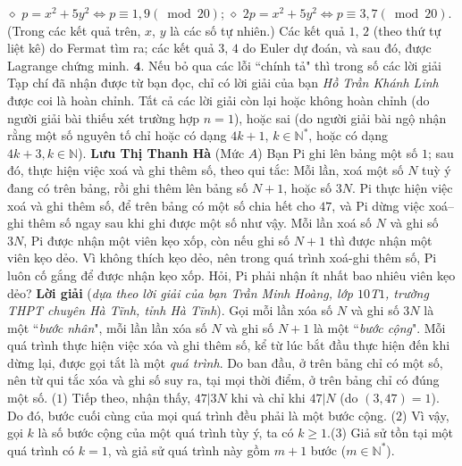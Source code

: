 \begin{multicols}{2}
	\vskip 0.05cm
	$\diamond$ $p = {x^2} + 5{y^2} \Leftrightarrow p \equiv 1,9\left( {\bmod 20} \right)$;
	\vskip 0.05cm
	$\diamond$ $2p = {x^2} + 5{y^2} \Leftrightarrow p \equiv 3,7\left( {\bmod 20} \right)$.
	\vskip 0.05cm
	(Trong các kết quả trên, $x$, $y$ là các số tự nhiên.)
	\vskip 0.05cm
	Các kết quả $1$, $2$ (theo thứ tự liệt kê) do Fermat tìm ra; các kết quả $3$, $4$ do Euler dự đoán, và sau đó, được Lagrange chứng minh.
	\vskip 0.05cm
	$\pmb{4.}$ Nếu bỏ qua các lỗi ``chính tả" thì trong số các lời giải Tạp chí đã nhận được từ bạn đọc, chỉ có lời giải của bạn \textit{Hồ Trần Khánh Linh} được coi là hoàn chỉnh. Tất cả các lời giải còn lại hoặc không hoàn chỉnh (do người giải bài thiếu xét trường hợp $n = 1$), hoặc sai (do người giải bài ngộ nhận rằng một số nguyên tố chỉ hoặc có dạng $4k + 1$, $k \in \mathbb{N^*}$, hoặc có dạng $4k + 3, k\in \mathbb{N}$).
	\vskip 0.05cm
	\hfill \textbf{Lưu Thị Thanh Hà}
	\vskip 0.05cm
	{}
	(Mức $A$) Bạn Pi ghi lên bảng một số $1$; sau đó, thực hiện việc xoá và ghi thêm số, theo qui tắc:  Mỗi lần, xoá một số $N$ tuỳ ý đang có trên bảng, rồi ghi thêm lên bảng số $N+1$,  hoặc số $3N$.
	\vskip 0.05cm
	Pi thực hiện việc xoá và ghi thêm số, để trên bảng có một số chia hết cho $47$, và Pi dừng việc xoá--ghi thêm số ngay sau khi ghi được một số như vậy. 
	\vskip 0.05cm
	Mỗi lần xoá số $N$ và ghi số $3N$, Pi được nhận một viên kẹo xốp, còn nếu ghi số $N+1$ thì được nhận một viên kẹo dẻo. Vì không thích kẹo dẻo, nên trong quá trình xoá-ghi thêm số, Pi luôn cố gắng để được nhận kẹo xốp. Hỏi, Pi phải nhận ít nhất bao nhiêu viên kẹo dẻo? 
	\vskip 0.05cm
	\textbf{Lời giải} (\textit{dựa theo lời giải của bạn Trần Minh Hoàng, lớp $10$T$1$, trường THPT chuyên Hà Tĩnh, tỉnh Hà Tĩnh}).
	\vskip 0.05cm
	Gọi mỗi lần xóa số $N$ và ghi số $3N$ là một ``\textit{bước nhân}", mỗi lần lần xóa số $N$ và ghi số $N + 1$ là một ``\textit{bước cộng}".
	\vskip 0.05cm
	Mỗi quá trình thực hiện việc xóa và ghi thêm số, kể từ lúc bắt đầu thực hiện đến khi dừng lại, được gọi tắt là một \textit{quá trình}.
	\vskip 0.05cm
	Do ban đầu, ở trên bảng chỉ có một số, nên từ qui tắc xóa và ghi số suy ra, tại mọi thời điểm, ở trên bảng chỉ có đúng một số.            \hfill ($1$)
	\vskip 0.05cm
	Tiếp theo, nhận thấy, $47|3N$  khi và chỉ khi $47|N$  (do $(3, 47) = 1$). Do đó, bước cuối cùng của mọi quá trình đều phải là một bước cộng. \hfill ($2$)
	\vskip 0.05cm
	Vì vậy, gọi $k$ là số bước cộng của một quá trình tùy ý, ta có $k \ge 1$.\hfill ($3$)
	\vskip 0.05cm
	Giả sử tồn tại một quá trình có $k = 1$, và giả sử quá trình này gồm $m + 1$ bước ($m \in \mathbb{N^*}$).

\end{multicols}
